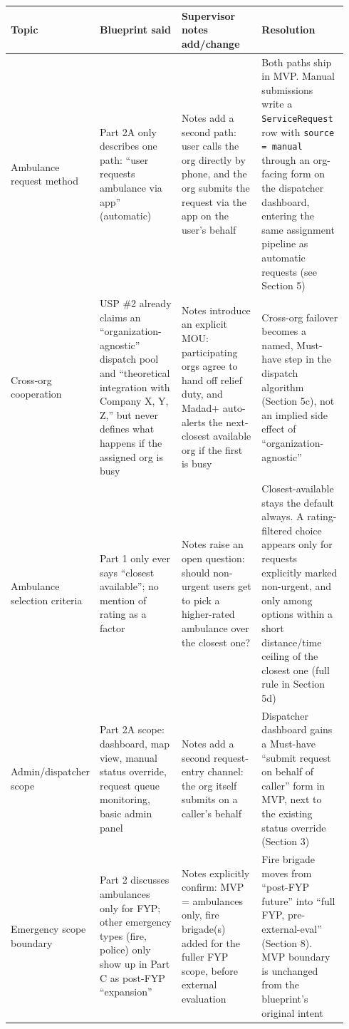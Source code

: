 \documentclass[11pt,a4paper]{article}
\begin{document}
\small
\begin{longtable}{p{0.13\linewidth} p{0.27\linewidth} p{0.27\linewidth} p{0.27\linewidth}}
\toprule
\textbf{Topic} & \textbf{Blueprint said} & \textbf{Supervisor notes add/change} & \textbf{Resolution} \\
\midrule
\endhead
Ambulance request method & Part 2A only describes one path: ``user requests ambulance via app'' (automatic) & Notes add a second path: user calls the org directly by phone, and the org submits the request via the app on the user's behalf & Both paths ship in MVP. Manual submissions write a \texttt{ServiceRequest} row with \texttt{source = manual} through an org-facing form on the dispatcher dashboard, entering the same assignment pipeline as automatic requests (see Section 5) \\
\addlinespace
Cross-org cooperation & USP \#2 already claims an ``organization-agnostic'' dispatch pool and ``theoretical integration with Company X, Y, Z,'' but never defines what happens if the assigned org is busy & Notes introduce an explicit MOU: participating orgs agree to hand off relief duty, and Madad+ auto-alerts the next-closest available org if the first is busy & Cross-org failover becomes a named, Must-have step in the dispatch algorithm (Section 5c), not an implied side effect of ``organization-agnostic'' \\
\addlinespace
Ambulance selection criteria & Part 1 only ever says ``closest available''; no mention of rating as a factor & Notes raise an open question: should non-urgent users get to pick a higher-rated ambulance over the closest one? & Closest-available stays the default always. A rating-filtered choice appears only for requests explicitly marked non-urgent, and only among options within a short distance/time ceiling of the closest one (full rule in Section 5d) \\
\addlinespace
Admin\slash dispatcher scope & Part 2A scope: dashboard, map view, manual status override, request queue monitoring, basic admin panel & Notes add a second request-entry channel: the org itself submits on a caller's behalf & Dispatcher dashboard gains a Must-have ``submit request on behalf of caller'' form in MVP, next to the existing status override (Section 3) \\
\addlinespace
Emergency scope boundary & Part 2 discusses ambulances only for FYP; other emergency types (fire, police) only show up in Part C as post-FYP ``expansion'' & Notes explicitly confirm: MVP = ambulances only, fire brigade(s) added for the fuller FYP scope, before external evaluation & Fire brigade moves from ``post-FYP future'' into ``full FYP, pre-external-eval'' (Section 8). MVP boundary is unchanged from the blueprint's original intent \\

\end{longtable}
\end{document}
